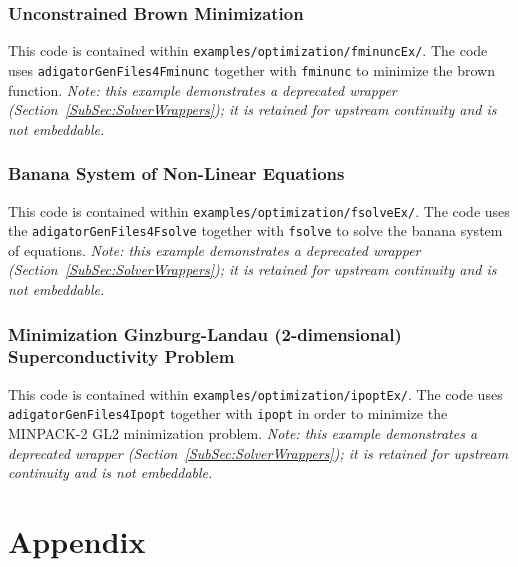 \documentclass[10pt,pdftex]{article}
\begin{document}
\subsubsection{Unconstrained Brown Minimization}
This code is contained within \texttt{examples/optimization/fminuncEx/}. The code uses \texttt{adigatorGenFiles4Fminunc} together with \texttt{fminunc} to minimize the brown function. \emph{Note: this example demonstrates a deprecated wrapper (Section~\ref{SubSec:SolverWrappers}); it is retained for upstream continuity and is not embeddable.}
\subsubsection{Banana System of Non-Linear Equations}
This code is contained within \texttt{examples/optimization/fsolveEx/}. The code uses the \texttt{adigatorGenFiles4Fsolve} together with \texttt{fsolve} to solve the banana system of equations. \emph{Note: this example demonstrates a deprecated wrapper (Section~\ref{SubSec:SolverWrappers}); it is retained for upstream continuity and is not embeddable.}
\subsubsection{Minimization Ginzburg-Landau (2-dimensional) Superconductivity Problem}
This code is contained within \texttt{examples/optimization/ipoptEx/}. The code uses \texttt{adigatorGenFiles4Ipopt} together with \texttt{ipopt} in order to minimize the MINPACK-2 GL2 minimization problem. \emph{Note: this example demonstrates a deprecated wrapper (Section~\ref{SubSec:SolverWrappers}); it is retained for upstream continuity and is not embeddable.}

\section*{Appendix}\hypertarget{Appendix}{}
\end{document}
